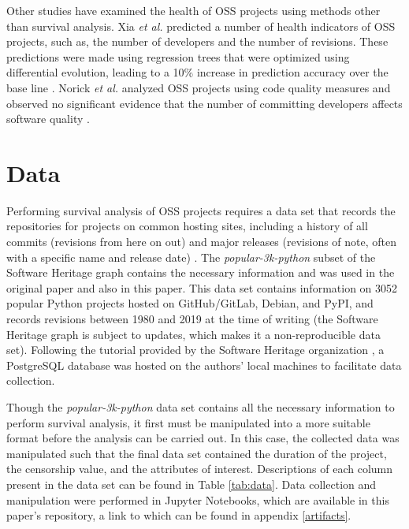 \documentclass[acmconf]{acmart}
\begin{document}
Other studies have examined the health of OSS projects using methods other than survival analysis. 
Xia \emph{et al.} predicted a number of health indicators of OSS projects, such as, the number of developers and the number of revisions. 
These predictions were made using regression trees that were optimized using differential evolution, leading to a 10\% increase in prediction accuracy over the base line \cite{xia2020predicting}. 
Norick \emph{et al.} analyzed OSS projects using code quality measures and observed no significant evidence that the number of committing developers affects software quality \cite{norick2010effects}. 

\section{Data} \label{data}

Performing survival analysis of OSS projects requires a data set that records the repositories for projects on common hosting sites, including a history of all commits (revisions from here on out) and major releases (revisions of note, often with a specific name and release date) \cite{ali2020cheating}. 
The \emph{popular-3k-python} subset of the Software Heritage graph \cite{pietri2019software} contains the necessary information and was used in the original paper and also in this paper.
This data set contains information on 3052 popular Python projects hosted on GitHub/GitLab, Debian, and PyPI, and records revisions between 1980 and 2019 at the time of writing (the Software Heritage graph is subject to updates, which makes it a non-reproducible data set).
Following the tutorial provided by the Software Heritage organization \cite{SQLdataset}, a PostgreSQL database was hosted on the authors' local machines to facilitate data collection.

Though the \emph{popular-3k-python} data set contains all the necessary information to perform survival analysis, it first must be manipulated into a more suitable format before the analysis can be carried out. 
In this case, the collected data was manipulated such that the final data set contained the duration of the project, the censorship value, and the attributes of interest. 
Descriptions of each column present in the data set can be found in Table \ref{tab:data}. 
Data collection and manipulation were performed in Jupyter Notebooks, which are available in this paper's repository, a link to which can be found in appendix \ref{artifacts}. 
\end{document}
